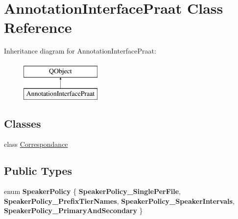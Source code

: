 \hypertarget{class_annotation_interface_praat}{}\section{Annotation\+Interface\+Praat Class Reference}
\label{class_annotation_interface_praat}
Inheritance diagram for Annotation\+Interface\+Praat\+:\begin{figure}[H]
\begin{center}
\leavevmode
\includegraphics[height=2.000000cm]{class_annotation_interface_praat}
\end{center}
\end{figure}
\subsection*{Classes}
\begin{DoxyCompactItemize}
\item 
class \hyperlink{class_annotation_interface_praat_1_1_correspondance}{Correspondance}
\end{DoxyCompactItemize}
\subsection*{Public Types}
\begin{DoxyCompactItemize}
\item 
\mbox{\label{class_annotation_interface_praat_a273453400af61ae2fcc5a7b9c1159ed3}} 
enum {\bfseries Speaker\+Policy} \{ {\bfseries Speaker\+Policy\+\_\+\+Single\+Per\+File}, 
{\bfseries Speaker\+Policy\+\_\+\+Prefix\+Tier\+Names}, 
{\bfseries Speaker\+Policy\+\_\+\+Speaker\+Intervals}, 
{\bfseries Speaker\+Policy\+\_\+\+Primary\+And\+Secondary}
 \}
\end{DoxyCompactItemize}
